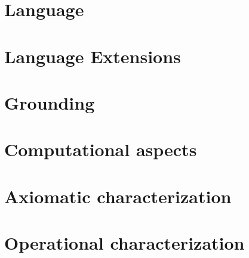 \documentclass{article}
\begin{document}
\section{Language}

\begin{refsection}
  \nocite{gekakasc12a}
  \nocite{PotasscoUserGuide19}
  \nocite{cafageiakakrlemarisc20a}
  \printbibliography[heading=subbibliography]
\end{refsection}

\section{Language Extensions}

\begin{refsection}
  \nocite{gekakasc12a}
  \printbibliography[heading=subbibliography]
\end{refsection}

\section{Grounding}

\begin{refsection}
  \nocite{gekakasc12a}
  \nocite{abhuvi95a}
  \printbibliography[heading=subbibliography]
\end{refsection}

\section{Computational aspects}

\begin{refsection}
  \nocite{gekakasc12a}
  \printbibliography[heading=subbibliography]
\end{refsection}

\section{Axiomatic characterization}

\begin{refsection}
  \nocite{gekakasc12a}
  \nocite{lifschitz08a,lifschitz10a}
  \printbibliography[heading=subbibliography]
\end{refsection}

\section{Operational characterization}
\end{document}
